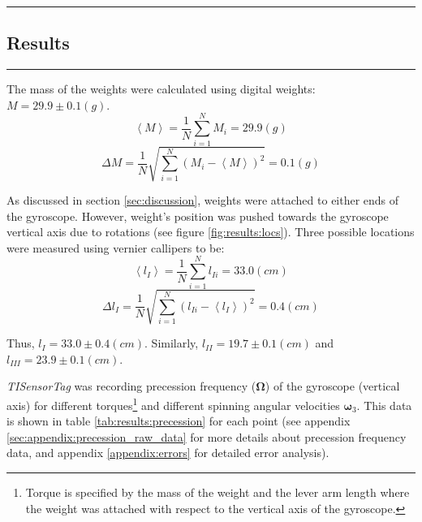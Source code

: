 {\color{gray}\hrule}
\begin{center}
\section{Results} \label{sec:results}
\bigskip
\end{center}
{\color{gray}\hrule}

\begin{multicols}{2} 
The mass of the weights were calculated using digital weights: $M = 29.9 \pm 0.1 (g)$.
\begin{equation} \label{eq:results:weight}
  \left\langle M \right\rangle = \frac{1}{N}\sum\limits_{i=1}^{N}M_{i} = 29.9 (g)
\end{equation}
\begin{equation} \label{eq:results:weight_err}
  \Delta M = \frac{1}{N}\sqrt{\sum\limits_{i=1}^{N}(M_{i} - \left\langle M \right\rangle)^{2}} = 0.1 (g)
\end{equation}

As discussed in section \ref{sec:discussion}, weights were attached to either ends of the gyroscope. However, weight's position was pushed towards the gyroscope vertical axis due to rotations (see figure \ref{fig:results:locs}). Three possible locations were measured using vernier callipers to be:
\begin{equation*}
  \left\langle l_{I} \right\rangle = \frac{1}{N}\sum\limits_{i=1}^{N}l_{Ii} = 33.0 (cm)
\end{equation*}
\begin{equation*}
  \Delta l_{I} = \frac{1}{N}\sqrt{\sum\limits_{i=1}^{N}(l_{Ii} - \left\langle l_{I} \right\rangle)^{2}} = 0.4 (cm)
\end{equation*}

Thus, $l_{I} = 33.0 \pm 0.4 (cm)$. Similarly, $l_{II} = 19.7 \pm 0.1 (cm)$ and $l_{III} = 23.9 \pm 0.1 (cm)$.

\emph{TISensorTag} was recording precession frequency ($\boldsymbol\Omega$) of the gyroscope (vertical axis) for different torques\footnote{Torque is specified by the mass of the weight and the lever arm length where the weight was attached with respect to the vertical axis of the gyroscope.} and different spinning angular velocities $\boldsymbol\omega_{3}$. This data is shown in table \ref{tab:results:precession} for each point (see appendix \ref{sec:appendix:precession_raw_data} for more details about precession frequency data, and appendix \ref{appendix:errors} for detailed error analysis).

\end{multicols}

